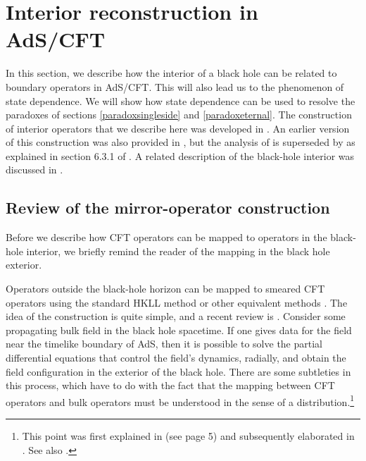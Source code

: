 \documentclass[12pt]{article}
\begin{document}
\section{Interior reconstruction in AdS/CFT \label{secstatedep}}
In this section, we describe how the interior of a black hole can be related to boundary operators in AdS/CFT. This will also lead us to the phenomenon of state dependence. We will show how state dependence can be used
to resolve the paradoxes of sections \ref{paradoxsingleside} and \ref{paradoxeternal}.  The construction of interior operators that we describe here was developed in \cite{Papadodimas:2013wnh,Papadodimas:2013jku,Papadodimas:2015jra}. An earlier version of this construction was also provided in \cite{Papadodimas:2012aq}, but the analysis of \cite{Papadodimas:2012aq} is superseded by \cite{Papadodimas:2013jku} as explained in section 6.3.1 of \cite{Papadodimas:2013jku}. A related description of the black-hole interior was discussed in \cite{Verlinde:2013uja,Verlinde:2013qya,Verlinde:2012cy}.

\subsection{Review of the  mirror-operator construction \label{mirroropreview}}
Before we describe how CFT operators can be mapped to operators in the black-hole interior, we briefly remind the reader of the mapping in the black hole exterior.

Operators outside the black-hole horizon can be mapped to smeared CFT operators \cite{Bena:1999jv} using the standard HKLL method \cite{Hamilton:2007wj,Hamilton:2006fh,Hamilton:2005ju,Hamilton:2006az} or other equivalent methods \cite{Koch:2010cy,Jevicki:2015sla}. The idea of the construction is quite simple, and a recent review is  \cite{Kajuri:2020vxf}. Consider some propagating bulk field in the black hole spacetime. If one gives data for the field near the timelike boundary of AdS, then it is possible to solve the partial differential equations that control the field's dynamics, radially, and obtain the field configuration in the exterior of the black hole.  There are some subtleties in this process, which have to do with the fact that the mapping between CFT operators and bulk operators must be understood in the sense of a distribution.\footnote{This point was first explained in \cite{Papadodimas:2013jku} (see page 5) and subsequently elaborated in \cite{Morrison:2014jha}. See also \cite{Banerjee:2019kjh}.} 
\end{document}
